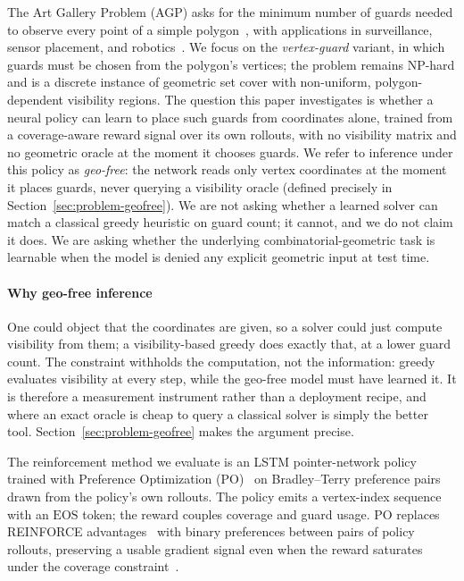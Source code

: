 \documentclass[11pt]{article}
\newcommand{\EOS}{\mathrm{EOS}}
\begin{document}
The Art Gallery Problem (AGP) asks for the minimum number of guards needed to observe every point of a simple polygon~\cite{LeeLin1986,ORourke1987AGT}, with applications in surveillance, sensor placement, and robotics~\cite{1545170,DBLP:journals/evi/BighamDK22}. We focus on the \emph{vertex-guard} variant, in which guards must be chosen from the polygon's vertices; the problem remains NP-hard and is a discrete instance of geometric set cover with non-uniform, polygon-dependent visibility regions. The question this paper investigates is whether a neural policy can learn to place such guards from coordinates alone, trained from a coverage-aware reward signal over its own rollouts, with no visibility matrix and no geometric oracle at the moment it chooses guards. We refer to inference under this policy as \emph{geo-free}: the network reads only vertex coordinates at the moment it places guards, never querying a visibility oracle (defined precisely in Section~\ref{sec:problem-geofree}). We are not asking whether a learned solver can match a classical greedy heuristic on guard count; it cannot, and we do not claim it does. We are asking whether the underlying combinatorial-geometric task is learnable when the model is denied any explicit geometric input at test time.

\paragraph{Why geo-free inference} One could object that the coordinates are given, so a solver could just compute visibility from them; a visibility-based greedy does exactly that, at a lower guard count. The constraint withholds the computation, not the information: greedy evaluates visibility at every step, while the geo-free model must have learned it. It is therefore a measurement instrument rather than a deployment recipe, and where an exact oracle is cheap to query a classical solver is simply the better tool. Section~\ref{sec:problem-geofree} makes the argument precise.

The reinforcement method we evaluate is an LSTM pointer-network policy trained with Preference Optimization (PO)~\cite{Pan2025PO} on Bradley--Terry preference pairs~\cite{BradleyTerry1952} drawn from the policy's own rollouts. The policy emits a vertex-index sequence with an $\EOS$ token; the reward couples coverage and guard usage. PO replaces REINFORCE advantages~\cite{Williams1992,Bello2016} with binary preferences between pairs of policy rollouts, preserving a usable gradient signal even when the reward saturates under the coverage constraint~\cite{Pan2025PO}. 
\end{document}
